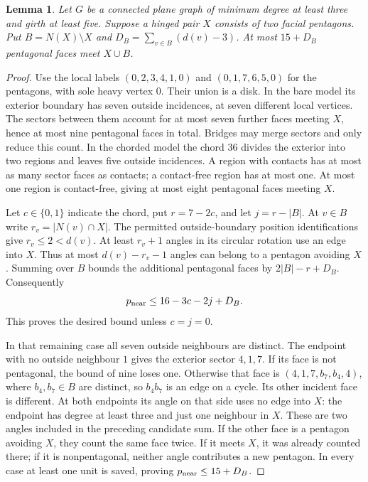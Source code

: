 \documentclass[11pt]{article}
\newtheorem{lemma}[theorem]{Lemma}
\theoremstyle{remark}
\numberwithin{equation}{section}
\numberwithin{table}{section}
\begin{document}
\begin{lemma}\label{lem:hinged-neighbourhood}
Let $G$ be a connected plane graph of minimum degree at least three and
girth at least five. Suppose a hinged pair $X$ consists of two facial
pentagons. Put $B=N(X)\setminus X$ and
$D_B=\sum_{v\in B}(d(v)-3)$. At most $15+D_B$ pentagonal faces meet
$X\cup B$.
\end{lemma}
\begin{proof}
Use the local labels $(0,2,3,4,1,0)$ and $(0,1,7,6,5,0)$ for the
pentagons, with sole heavy vertex $0$. Their union is a disk. In the
bare model its exterior boundary has seven outside incidences, at
seven different local vertices. The sectors between them account for
at most seven further faces meeting $X$, hence at most nine pentagonal
faces in total. Bridges may merge sectors and only reduce this count.
In the chorded model the chord $36$ divides the exterior into two
regions and leaves five outside incidences. A region with contacts
has at most as many sector faces as contacts; a contact-free region
has at most one. At most one region is contact-free, giving at most
eight pentagonal faces meeting $X$.

Let $c\in\{0,1\}$ indicate the chord, put $r=7-2c$, and let
$j=r-|B|$. At $v\in B$ write $r_v=|N(v)\cap X|$. The permitted
outside-boundary position identifications give $r_v\le2<d(v)$. At least $r_v+1$
angles in its circular rotation use an edge into $X$. Thus at most
$d(v)-r_v-1$ angles can belong to a pentagon avoiding $X$. Summing
over $B$ bounds the additional pentagonal faces by
$2|B|-r+D_B$. Consequently
\[
 p_{\rm near}\le16-3c-2j+D_B.
\]
This proves the desired bound unless $c=j=0$.

In that remaining case all seven outside neighbours are distinct.
The endpoint with no outside neighbour $1$ gives the exterior sector $4,1,7$. If
its face is not pentagonal, the bound of nine loses one. Otherwise
that face is $(4,1,7,b_7,b_4,4)$, where $b_4,b_7\in B$ are distinct,
so $b_4b_7$ is an edge on a cycle. Its other incident face is different.
At both endpoints its angle on that side uses no edge into $X$:
the endpoint has degree at least three and just one neighbour in $X$.
These are two angles included in the preceding candidate sum. If the
other face is a pentagon avoiding $X$, they count the same face twice.
If it meets $X$, it was already counted there; if it is nonpentagonal,
neither angle contributes a new pentagon. In every case at least one
unit is saved, proving $p_{\rm near}\le15+D_B$.
\end{proof}
\end{document}
